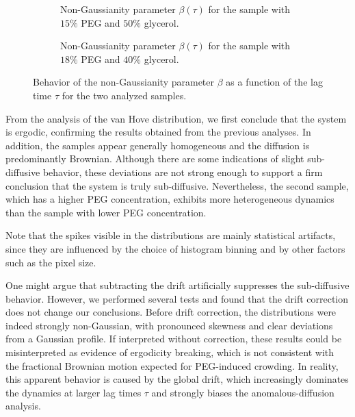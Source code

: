 \begin{figure}[!htbp]
    \centering
    \begin{subfigure}[t]{0.48\textwidth}
        \centering
        
        \caption{Non-Gaussianity parameter $\beta(\tau)$ for the sample with $15\%$ PEG and $50\%$ glycerol.}
        \label{fig:beta_vs_tau_glic50}
    \end{subfigure}
    \hfill
    \begin{subfigure}[t]{0.48\textwidth}
        \centering
        
        \caption{Non-Gaussianity parameter $\beta(\tau)$ for the sample with $18\%$ PEG and $40\%$ glycerol.}
        \label{fig:beta_vs_tau_glic200}
    \end{subfigure}

    \caption{Behavior of the non-Gaussianity parameter $\beta$ as a function of the lag time $\tau$ for the two analyzed samples.}
    \label{fig:beta_vs_tau}
\end{figure}
\FloatBarrier

From the analysis of the van Hove distribution, we first conclude that the system is ergodic, confirming the results obtained from the previous analyses. In addition, the samples appear generally homogeneous and the diffusion is predominantly Brownian. Although there are some indications of slight sub-diffusive behavior, these deviations are not strong enough to support a firm conclusion that the system is truly sub-diffusive. Nevertheless, the second sample, which has a higher PEG concentration, exhibits more heterogeneous dynamics than the sample with lower PEG concentration.

Note that the spikes visible in the distributions are mainly statistical artifacts, since they are influenced by the choice of histogram binning and by other factors such as the pixel size.

One might argue that subtracting the drift artificially suppresses the sub-diffusive behavior. However, we performed several tests and found that the drift correction does not change our conclusions. Before drift correction, the distributions were indeed strongly non-Gaussian, with pronounced skewness and clear deviations from a Gaussian profile. If interpreted without correction, these results could be misinterpreted as evidence of ergodicity breaking, which is not consistent with the fractional Brownian motion expected for PEG-induced crowding. In reality, this apparent behavior is caused by the global drift, which increasingly dominates the dynamics at larger lag times $\tau$ and strongly biases the anomalous-diffusion analysis.

